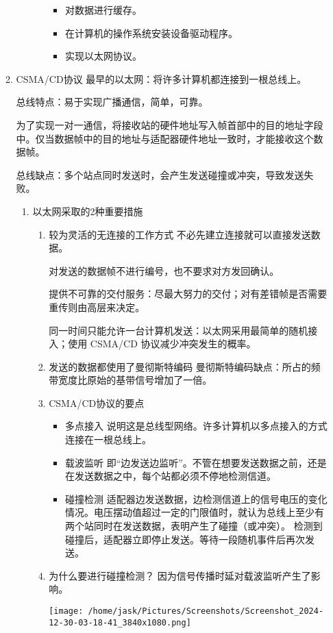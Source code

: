 \documentclass[11pt]{article}
\begin{document}
\begin{enumerate}
\begin{enumerate}
\begin{enumerate}
\begin{itemize}
\begin{itemize}
\item 对数据进行缓存。

\item 在计算机的操作系统安装设备驱动程序。

\item 实现以太网协议。
\end{itemize}
\end{itemize}
\end{enumerate}
\item CSMA/CD协议
\label{sec:org8befabc}
最早的以太网：将许多计算机都连接到一根总线上。

总线特点：易于实现广播通信，简单，可靠。

为了实现一对一通信，将接收站的硬件地址写入帧首部中的目的地址字段中。仅当数据帧中的目的地址与适配器硬件地址一致时，才能接收这个数据帧。

总线缺点：多个站点同时发送时，会产生发送碰撞或冲突，导致发送失败。
\begin{enumerate}
\item 以太网采取的2种重要措施
\label{sec:org7552cc8}

\begin{enumerate}
\item 较为灵活的无连接的工作方式
不必先建立连接就可以直接发送数据。

对发送的数据帧不进行编号，也不要求对方发回确认。

提供不可靠的交付服务：尽最大努力的交付；对有差错帧是否需要重传则由高层来决定。

同一时间只能允许一台计算机发送：以太网采用最简单的随机接入；使用 CSMA/CD 协议减少冲突发生的概率。

\item 发送的数据都使用了曼彻斯特编码
曼彻斯特编码缺点：所占的频带宽度比原始的基带信号增加了一倍。

\item CSMA/CD协议的要点
\begin{itemize}
\item 多点接入
说明这是总线型网络。许多计算机以多点接入的方式连接在一根总线上。

\item 载波监听
即“边发送边监听”。不管在想要发送数据之前，还是在发送数据之中，每个站都必须不停地检测信道。

\item 碰撞检测
适配器边发送数据，边检测信道上的信号电压的变化情况。电压摆动值超过一定的门限值时，就认为总线上至少有两个站同时在发送数据，表明产生了碰撞（或冲突）。
检测到碰撞后，适配器立即停止发送。等待一段随机事件后再次发送。
\end{itemize}
\item 为什么要进行碰撞检测？
因为信号传播时延对载波监听产生了影响。
\begin{center}
\texttt{[image: /home/jask/Pictures/Screenshots/Screenshot\_2024-12-30-03-18-41\_3840x1080.png]}
\end{center}


\end{enumerate}
\end{enumerate}
\end{enumerate}
\end{enumerate}
\end{document}
